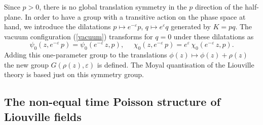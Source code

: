 \documentclass[a4paper,12pt]{article}
\begin{document}
\noindent
Since $p>0$, there is no global translation symmetry in the $p$
direction of the half-plane. In order to have  a group
with a transitive action on the phase space at hand, we introduce the
dilatations $p\mapsto e^{-\varepsilon} p$, $q\mapsto e^{\varepsilon}q$
generated by $K=pq$. The vacuum configuration (\ref{vacuum})
transforms for $q=0$ under these dilatations as
\begin{equation}\label{vacuum-symm}
\psi_0(z,e^{-\varepsilon}\,p)=\psi_0(e^{-\varepsilon}\,z,p),~~~~~~
\chi_0(z,e^{-\varepsilon}\,p)=e^{\varepsilon}\,\chi_0(e^{-\varepsilon}\,z,p).
\end{equation}
Adding this one-parameter group to the translations $\phi(z)\mapsto
\phi(z)+\rho(z)$ the new group $G(\rho(z),\varepsilon)$ is defined.
The Moyal quantisation of the Liouville
theory is based just on this symmetry group.


\subsection{The non-equal time Poisson structure of Liouville fields}
\end{document}
